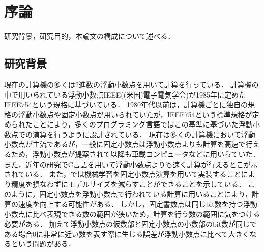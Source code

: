\chapter{序論}
\label{chap:序論}
研究背景，研究目的，本論文の構成について述べる．
\begin{comment}
    目標規定：
    この修士論文は，固定小数点演算が浮動小数点演算に比べ精度の高い計算を行える場合があることを示すために書く．
\end{comment}
\section{研究背景}
\begin{comment}
    研究テーマにおける既存の知見は何か？
    分かっていないこと、究明すべきことは何か？
    その不足点を究明する意義は何か？
    自分の研究の論拠や仮説は何か？
    
    ストーリー：
    固定小数点演算は浮動小数点演算よりも計算時間が速いとされている．
    しかし，浮動小数点に比べて精度が低くなる恐れがある．
    本論文では，固定小数点と浮動小数点での数値計算の結果を比べ，固定小数点での演算も浮動小数点と同程度の精度で計算できることを示した．
    実験結果より固定小数点演算で浮動小数点より高速で，浮動小数点と同程度の計算を実現できるのではないかと考える．
\end{comment}
現在の計算機の多くは2進数の浮動小数点を用いて計算を行っている．
計算機の中で用いられている浮動小数点IEEE((米国)電子電気学会)が1985年に定めたIEEE754という規格に基づいている．
1980年代以前は，計算機ごとに独自の規格の浮動小数点や固定小数点が用いられていたが，IEEE754という標準規格が定められたことにより，多くのプログラミング言語ではこの基準に基づいた浮動小数点での演算を行うように設計されている．
現在は多くの計算機において浮動小数点が主流であるが，一般に固定小数点は浮動小数点よりも計算を高速で行えるため，浮動小数点が提案されて以降も車載コンピュータなどに用いらていた．
また，近年の研究でC言語を用いて浮動小数点よりも速く計算が行えるとこが示されている\cite{IJERTV12IS010134}．
また，\cite{pmlr-v48-linb16}では機械学習を固定小数点演算を用いて実装することにより精度を損なわずにモデルサイズを減らすことができることを示している．
このように，固定小数点を浮動小数点で行われている計算に用いることにより，計算の速度を向上する可能性がある．
しかし，固定書数点は同じbit数を持つ浮動小数点に比べ表現できる数の範囲が狭いため，計算を行う数の範囲に気をつける必要がある．
加えて浮動小数点の仮数部と固定小数点の小数部のbit数が同じである場合$0$に非常に近い数を表す際に生じる誤差が浮動小数点に比べて大きくなるという問題がある．


